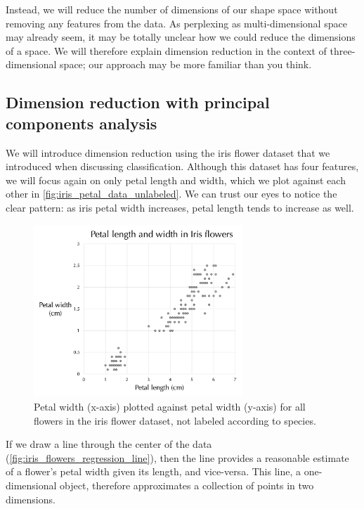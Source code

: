 Instead, we will reduce the number of dimensions of our shape space without removing any features from the data. As perplexing as multi-dimensional space may already seem, it may be totally unclear how we could reduce the dimensions of a space. We will therefore explain dimension reduction in the context of three-dimensional space; our approach may be more familiar than you think.

\FloatBarrier
{}
\subsection{Dimension reduction with principal components analysis}

We will introduce dimension reduction using the iris flower dataset that we introduced when discussing classification. Although this dataset has four features, we will focus again on only petal length and width, which we plot against each other in \autoref{fig:iris_petal_data_unlabeled}. We can trust our eyes to notice the clear pattern: as iris petal width increases, petal length tends to increase as well.

\begin{figure}[h]
\centering
\mySfFamily
\includegraphics[width = 0.7\textwidth]{../images/iris_petal_data_unlabeled.png}
\caption{Petal width (x-axis) plotted against petal width (y-axis) for all flowers in the iris flower dataset, not labeled according to species.}
\label{fig:iris_petal_data_unlabeled}
\end{figure}

If we draw a line through the center of the data (\autoref{fig:iris_flowers_regression_line}), then the line provides a reasonable estimate of a flower's petal width given its length, and vice-versa. This line, a one-dimensional object, therefore approximates a collection of points in two dimensions.\\

